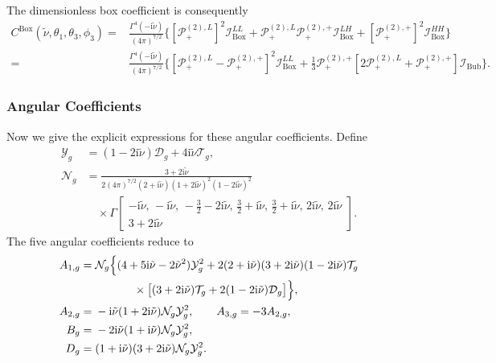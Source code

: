 \documentclass[a4paper,12pt]{article}
\def\ii{\mathrm{i}}
\begin{document}
The dimensionless box coefficient is consequently
\begin{align}
    C^{\mathrm{Box}}(\tilde\nu,\theta_1,\theta_3,\phi_3)
    ={}&\frac{\Gamma^4(-\ii\tilde\nu)}{(4\pi)^{7/2}}
    \Big\{
    [\mathcal P^{(2),L}_{+}]^2\mathcal I^{LL}_{\mathrm{Box}}
    +\mathcal P^{(2),L}_{+}\mathcal P^{(2),+}_{+}
    \mathcal I^{LH}_{\mathrm{Box}}
    +[\mathcal P^{(2),+}_{+}]^2\mathcal I^{HH}_{\mathrm{Box}}\Big\}
    \nonumber\\
    ={}&\frac{\Gamma^4(-\ii\tilde\nu)}{(4\pi)^{7/2}}
    \Big\{
    [\mathcal P^{(2),L}_{+}-\mathcal P^{(2),+}_{+}]^2
    \mathcal I^{LL}_{\mathrm{Box}}
    +\frac13\mathcal P^{(2),+}_{+}
    [2\mathcal P^{(2),L}_{+}+\mathcal P^{(2),+}_{+}]
    \mathcal I_{\mathrm{Bub}}\Big\}.
    \label{eq:box-C-reduced}
\end{align}

\subsubsection{Angular Coefficients}
\label{app:box-angular-projections}

Now we give the explicit expressions for these angular coefficients.
Define
\begin{align}
 \mathcal Y_g&=(1-2\ii\tilde\nu)\mathcal D_g
              +4\ii\tilde\nu\mathcal T_g,\nonumber\\
 \mathcal N_g&=
 \frac{3+2\ii\tilde\nu}
 {2(4\pi)^{7/2}(2+\ii\tilde\nu)(1+2\ii\tilde\nu)^2
 (1-2\ii\tilde\nu)^2}
 \nonumber\\
 &\quad\times\Gamma\!\left[\begin{matrix}
 -\ii\tilde\nu,\,-\ii\tilde\nu,\,-\tfrac32-2\ii\tilde\nu,\,
 \tfrac32+\ii\tilde\nu,\,\tfrac32+\ii\tilde\nu,\,
 2\ii\tilde\nu,\,2\ii\tilde\nu\\
 3+2\ii\tilde\nu
 \end{matrix}\right].
 \label{eq:gauge-angular-common}
\end{align}
The five angular coefficients reduce to
\begin{align}
 A_{1,g}={}&\mathcal N_g\Big\{
 (4+5\ii\tilde\nu-2\tilde\nu^2)\mathcal Y_g^2
 +2(2+\ii\tilde\nu)(3+2\ii\tilde\nu)(1-2\ii\tilde\nu)\mathcal T_g
 \nonumber\\
 &\hspace{12mm}\times\big[(3+2\ii\tilde\nu)\mathcal T_g
 +2(1-2\ii\tilde\nu)\mathcal D_g\big]\Big\},\nonumber\\
 A_{2,g}={}&-\ii\tilde\nu(1+2\ii\tilde\nu)\mathcal N_g\mathcal Y_g^2,
 \qquad A_{3,g}=-3A_{2,g},\nonumber\\
 B_g={}&-2\ii\tilde\nu(1+\ii\tilde\nu)\mathcal N_g\mathcal Y_g^2,\nonumber\\
 D_g={}&(1+\ii\tilde\nu)(3+2\ii\tilde\nu)\mathcal N_g\mathcal Y_g^2.
 \label{eq:gauge-angular-finite}
\end{align}
\end{document}
